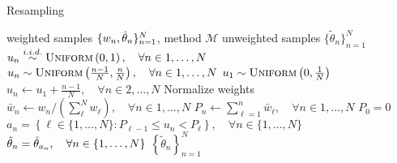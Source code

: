\begin{algorithm}[tb]
	\caption{Resampling}
	\label{alg:inf:resampling}
	\begin{spacing}{1.2}
		\begin{algorithmic}[1]
			\renewcommand{\algorithmicrequire}{\textbf{Inputs:}}
			\renewcommand{\algorithmicensure}{\textbf{Outputs:}}				 
			\Require weighted samples $\{w_n,\hat{\theta}_n\}_{n=1}^N$, method $\mathcal{M}$
			\Ensure unweighted samples $\{\tilde{\theta}_n\}_{n=1}^N$
			\State $u_n \overset{i.i.d.}{\sim} \textsc{Uniform}\left(0,1\right), \quad \forall n\in1,\dots,N$ \vspace{-3pt}
			\EndCase
			\State $u_n \sim \textsc{Uniform}\left(\frac{n-1}{N},\frac{n}{N}\right), \quad \forall n\in1,\dots,N$
			\vspace{-3pt}
			\EndCase
			\State $u_1 \sim  \textsc{Uniform}\left(0,\frac{1}{N}\right)$
			\State $u_n \leftarrow u_1+\frac{n-1}{N}, \quad \forall n\in2,\dots,N$ \vspace{-3pt}
			\EndCase
			\EndSwitch
			\State Normalize weights $\bar{w}_n \leftarrow w_n/\left(\sum_{\ell}^N w_{\ell}\right), 
						\quad \forall n \in 1,\dots,N$
			\State $P_n \leftarrow \sum_{\ell=1}^n \bar{w}_{\ell}, \quad \forall n\in1,\dots,N$
			\Comment $P_0 =0$
			\State $a_n = \left\{\ell \in \{1,\dots,N\} \colon P_{\ell-1} \le u_n < P_\ell\right\}, \quad \forall n \in \{1,\dots,N\}$
			\State $\tilde{\theta}_n = \hat{\theta}_{a_n}, \quad \forall n \in \{1,\dots,N\}$
			\State \Return $\left\{\tilde{\theta}_n\right\}_{n=1}^N$
		\end{algorithmic}
	\end{spacing}
\end{algorithm}

